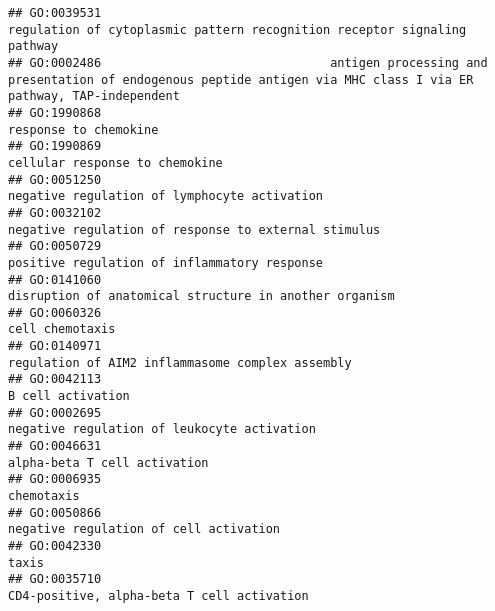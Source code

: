 \documentclass[
]{article}
\begin{document}
\begin{verbatim}
## GO:0039531                                                                         regulation of cytoplasmic pattern recognition receptor signaling pathway
## GO:0002486                                antigen processing and presentation of endogenous peptide antigen via MHC class I via ER pathway, TAP-independent
## GO:1990868                                                                                                                            response to chemokine
## GO:1990869                                                                                                                   cellular response to chemokine
## GO:0051250                                                                                                     negative regulation of lymphocyte activation
## GO:0032102                                                                                             negative regulation of response to external stimulus
## GO:0050729                                                                                                     positive regulation of inflammatory response
## GO:0141060                                                                                           disruption of anatomical structure in another organism
## GO:0060326                                                                                                                                  cell chemotaxis
## GO:0140971                                                                                                 regulation of AIM2 inflammasome complex assembly
## GO:0042113                                                                                                                                B cell activation
## GO:0002695                                                                                                      negative regulation of leukocyte activation
## GO:0046631                                                                                                                     alpha-beta T cell activation
## GO:0006935                                                                                                                                       chemotaxis
## GO:0050866                                                                                                           negative regulation of cell activation
## GO:0042330                                                                                                                                            taxis
## GO:0035710                                                                                                       CD4-positive, alpha-beta T cell activation

\end{verbatim}
\end{document}
